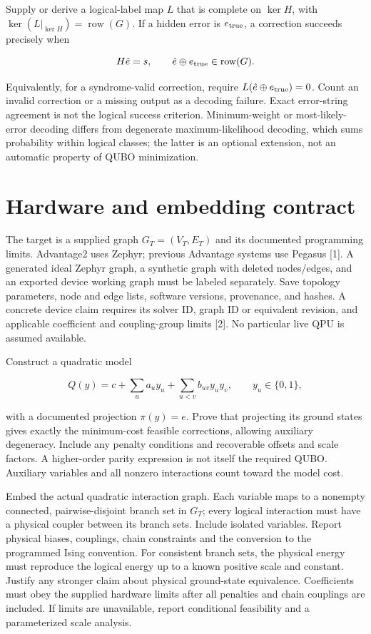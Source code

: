 \documentclass[11pt,letterpaper]{article}
\begin{document}
Supply or derive a logical-label map $L$ that is complete on $\ker H$, with $\ker(L|_{\ker H})=\operatorname{row}(G)$. If a hidden error is $e_{\rm true}$, a correction succeeds precisely when\par

\[H\hat e=s,\qquad \hat e\oplus e_{\rm true}\in\operatorname{row}(G).\]

Equivalently, for a syndrome-valid correction, require $L(\hat e\oplus e_{\rm true})=0$. Count an invalid correction or a missing output as a decoding failure. Exact error-string agreement is not the logical success criterion. Minimum-weight or most-likely-error decoding differs from degenerate maximum-likelihood decoding, which sums probability within logical classes; the latter is an optional extension, not an automatic property of QUBO minimization.\par

\section{Hardware and embedding contract}

The target is a supplied graph $G_T=(V_T,E_T)$ and its documented programming limits. Advantage2 uses Zephyr; previous Advantage systems use Pegasus [1]. A generated ideal Zephyr graph, a synthetic graph with deleted nodes/edges, and an exported device working graph must be labeled separately. Save topology parameters, node and edge lists, software versions, provenance, and hashes. A concrete device claim requires its solver ID, graph ID or equivalent revision, and applicable coefficient and coupling-group limits [2]. No particular live QPU is assumed available.\par

Construct a quadratic model\par

\[Q(y)=c+\sum_u a_u y_u+\sum_{u<v}b_{uv}y_uy_v,\qquad y_u\in\{0,1\},\]

with a documented projection $\pi(y)=e$. Prove that projecting its ground states gives exactly the minimum-cost feasible corrections, allowing auxiliary degeneracy. Include any penalty conditions and recoverable offsets and scale factors. A higher-order parity expression is not itself the required QUBO. Auxiliary variables and all nonzero interactions count toward the model cost.\par

Embed the actual quadratic interaction graph. Each variable maps to a nonempty connected, pairwise-disjoint branch set in $G_T$; every logical interaction must have a physical coupler between its branch sets. Include isolated variables. Report physical biases, couplings, chain constraints and the conversion to the programmed Ising convention. For consistent branch sets, the physical energy must reproduce the logical energy up to a known positive scale and constant. Justify any stronger claim about physical ground-state equivalence. Coefficients must obey the supplied hardware limits after all penalties and chain couplings are included. If limits are unavailable, report conditional feasibility and a parameterized scale analysis.\par
\end{document}

